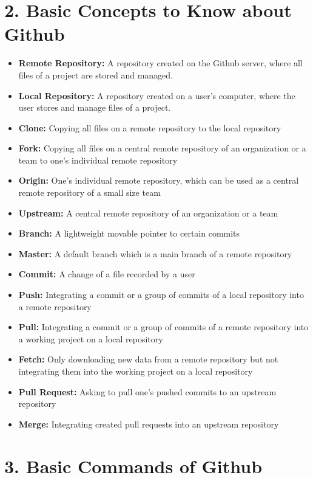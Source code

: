 \documentclass[fleqn,10pt]{wlscirep}
\begin{document}
\section*{2. Basic Concepts to Know about Github}
\begin{itemize}
\item \textbf{Remote Repository:} A repository created on the Github server, where all files of a project are stored and managed.
\item \textbf{Local Repository:} A repository created on a user’s computer, where the user stores and manage files of a project.
\item \textbf{Clone:} Copying all files on a remote repository to the local repository
\item \textbf{Fork:} Copying all files on a central remote repository of an organization or a team to one’s individual remote repository 
\item \textbf{Origin:} One’s individual remote repository, which can be used as a central remote repository of a small size team
\item \textbf{Upstream:} A central remote repository of an organization or a team
\item \textbf{Branch:} A lightweight movable pointer to certain commits\cite{GitBranch}
\item \textbf{Master:} A default branch which is a main branch of a remote repository
\item \textbf{Commit:} A change of a file recorded by a user
\item \textbf{Push:} Integrating a commit or a group of commits of a local repository into a remote repository
\item \textbf{Pull:} Integrating a commit or a group of commits of a remote repository into a working project on a local repository
\item \textbf{Fetch:} Only downloading new data from a remote repository but not integrating them into the working project on a local repository
\item \textbf{Pull Request:} Asking to pull one’s pushed commits to an upstream repository
\item \textbf{Merge:} Integrating created pull requests into an upstream repository
\end{itemize}


\section*{3. Basic Commands of Github}
\end{document}
